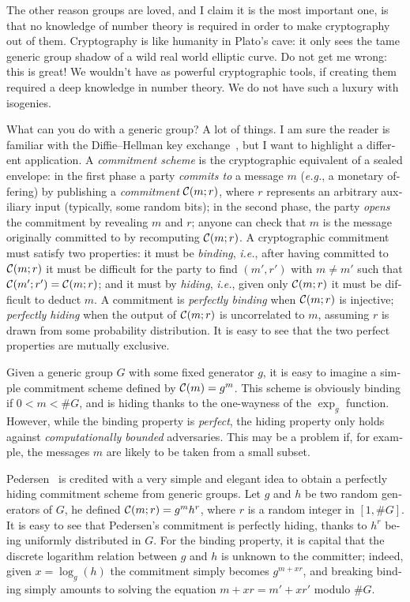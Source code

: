 \begin{otherlanguage}{english}
  The other reason groups are loved, and I claim it is the most
  important one, is that no knowledge of number theory is required
  in order to make cryptography out of them.  Cryptography is like
  humanity in Plato's cave: it only sees the tame generic group shadow
  of a wild real world elliptic curve. Do not get me wrong: this is
  great! We wouldn't have as powerful cryptographic tools, if creating
  them required a deep knowledge in number theory. We do not have such
  a luxury with isogenies.
  
  What can you do with a generic group? A lot of things. I am sure the
  reader is familiar with the Diffie--Hellman key
  exchange~\cite{DifHel76}, but I want to highlight a different
  application. A \emph{commitment scheme} is the cryptographic
  equivalent of a sealed envelope: in the first phase a party
  \emph{commits to} a message $m$ (\emph{e.g.}, a monetary offering)
  by publishing a \emph{commitment} $\mathcal{C}(m;r)$, where $r$ represents
  an arbitrary auxiliary input (typically, some random bits); in the
  second phase, the party \emph{opens} the commitment by revealing $m$
  and $r$; anyone can check that $m$ is the message originally
  committed to by recomputing $\mathcal{C}(m;r)$.  A cryptographic commitment
  must satisfy two properties: it must be \emph{binding}, \emph{i.e.},
  after having committed to $\mathcal{C}(m;r)$ it must be difficult for the
  party to find $(m',r')$ with $m\ne m'$ such that
  $\mathcal{C}(m';r')=\mathcal{C}(m;r)$; and it must by \emph{hiding}, \emph{i.e.},
  given only $\mathcal{C}(m;r)$ it must be difficult to deduct $m$.  A
  commitment is \emph{perfectly binding} when $\mathcal{C}(m;r)$ is
  injective; \emph{perfectly hiding} when the output of $\mathcal{C}(m;r)$ is
  uncorrelated to $m$, assuming $r$ is drawn from some probability
  distribution. It is easy to see that the two perfect properties are
  mutually exclusive.

  Given a generic group $G$ with some fixed generator $g$, it is easy
  to imagine a simple commitment scheme defined by $\mathcal{C}(m) =
  g^m$. This scheme is obviously binding if $0<m<\#G$, and is hiding
  thanks to the one-wayness of the $\exp_g$ function. However, while
  the binding property is \emph{perfect}, the hiding property only
  holds against \emph{computationally bounded} adversaries. This may
  be a problem if, for example, the messages $m$ are likely to be
  taken from a small subset.

  Pedersen~\cite{C:Pedersen91} is credited with a very simple and
  elegant idea to obtain a perfectly hiding commitment scheme from
  generic groups. Let $g$ and $h$ be two random generators of $G$, he
  defined $\mathcal{C}(m;r)=g^m h^r$, where $r$ is a random integer in
  $[1,\#G]$. It is easy to see that Pedersen's commitment is perfectly
  hiding, thanks to $h^r$ being uniformly distributed in $G$. For the
  binding property, it is capital that the discrete logarithm relation
  between $g$ and $h$ is unknown to the committer; indeed, given
  $x=\log_g(h)$ the commitment simply becomes $g^{m+xr}$, and breaking
  binding simply amounts to solving the equation $m+xr=m'+xr'$ modulo
  $\#G$.


\end{otherlanguage}
